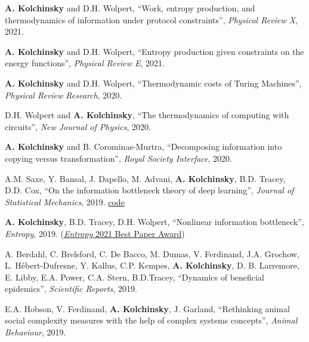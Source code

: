 \textbf{A. Kolchinsky} and D.H. Wolpert, ``Work, entropy production, and thermodynamics of information under protocol constraints'', \emph{Physical Review X}, 2021. 

\textbf{A. Kolchinsky} and D.H. Wolpert, ``Entropy production given constraints on the energy functions'', \emph{Physical Review E}, 2021. 

\textbf{A. Kolchinsky} and D.H. Wolpert, ``Thermodynamic costs of Turing Machines'', \emph{Physical Review Research}, 2020. %

D.H. Wolpert and \textbf{A. Kolchinsky}, ``The thermodynamics of computing with circuits'', \emph{New Journal of Physics}, 2020.  %

\textbf{A. Kolchinsky} and B. Corominas-Murtra, ``Decomposing information into copying versus transformation'', 
\emph{Royal Society Interface}, 2020. %

A.M. Saxe, Y. Bansal, J. Dapello, M. Advani, \textbf{A. Kolchinsky}, B.D. Tracey, D.D. Cox, 
``On the information bottleneck theory of deep learning'',  \emph{Journal of Statistical Mechanics}, 2019. 
\href{https://github.com/artemyk/ibsgd/tree/iclr2018}{code} %

\textbf{A. Kolchinsky}, B.D. Tracey, D.H. Wolpert, ``Nonlinear information bottleneck'', \emph{Entropy}, 2019.
 (\href{https://www.mdpi.com/journal/entropy/awards/1209}{{\emph{Entropy} 2021 Best Paper Award}})

A. Berdahl, C. Brelsford, C. De Bacco, M. Dumas, V. Ferdinand, J.A. Grochow, L. Hébert-Dufresne,
Y. Kallus, C.P. Kempes, \textbf{A. Kolchinsky}, D. B. Larremore,
E. Libby, E.A. Power, C.A. Stern, B.D.Tracey, ``Dynamics of beneficial epidemics'', \emph{Scientific Reports}, 2019. 

E.A. Hobson, V. Ferdinand, \textbf{A. Kolchinsky}, J. Garland, 
``Rethinking animal social complexity measures with the help of complex systems concepts'', 
\emph{Animal Behaviour}, 2019. 

